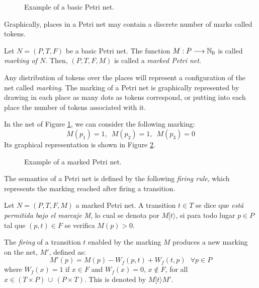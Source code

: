 \begin{figure}

\caption{\label{fig201} Example of a basic Petri net.}
\end{figure}

Graphically, places in a Petri net may contain a discrete number of marks called tokens. 

\begin{definition} 
Let $N=(P,T,F)$ be a basic Petri net.
The function $M: P \longrightarrow
\mathbb{N}_{0}$ is called {\it marking of $N$}. Then,
$(P,T,F,M)$ is called a {\it marked Petri net}.
\end{definition}

Any distribution of tokens over the places will represent a configuration of the net called \emph{marking}.
The marking of a Petri net is graphically represented by drawing
in each place as many dots as tokens correspond,
or putting into each place the number of tokens associated with it. 


\begin{example} In the net of Figure \ref{fig201}, we can consider the following marking:
\[ M(p_1) = 1,\,\,\,M(p_2)=1,\,\,\,M(p_3)=0 \]
Its graphical representation is shown in Figure \ref{fig202}.
\end{example}

\begin{figure}

\caption{\label{fig202} Example of a marked Petri net.}
\end{figure}

The semantics of a Petri net is defined by the following \emph{firing rule}, which
represents the marking reached after firing a transition.

\begin{definition}
Let $N=(P,T,F,M)$ a marked Petri net. A transition $t \in T$
se dice que {\it est\'{a} permitida bajo el marcaje M},
lo cual se denota por $M[t\rangle$, si para todo
lugar $p \in P$ tal que $(p,t) \in F$ se verifica $M(p) > 0$.
\end{definition}

\begin{definition}
The \emph{firing} of a transition $t$ enabled by the marking $M$
produces a new marking on the net, $M'$, defined as:
\[M'(p) = M(p) - W_f(p,t) + W_f(t,p)~~~\forall p \in P\]
where $W_f(x) = 1$ if $x \in F$ and $W_f(x) = 0$, $x \not\in F$,
for all $x \in (T \times P) \, \cup \, (P \times T)$.
This is denoted by $M[t\rangle M'$.
\end{definition}

